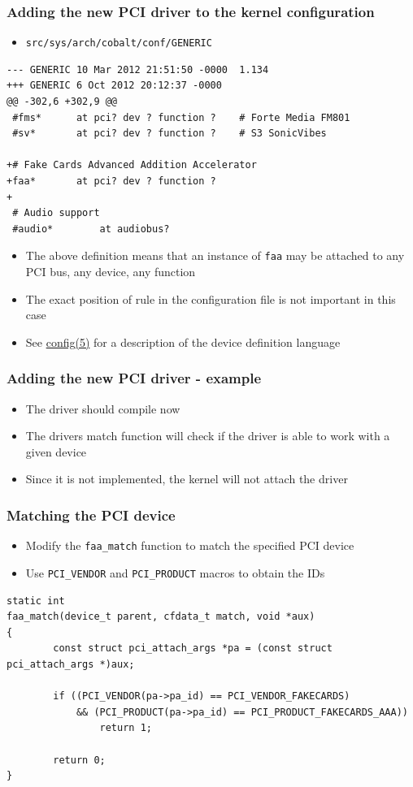 \documentclass[dvipsnames,table]{beamer}
\begin{document}
\begin{frame}[fragile]
\frametitle{Adding the new PCI driver to the kernel configuration}
\scriptsize
\begin{itemize}
	\item {\tt src/sys/arch/cobalt/conf/GENERIC}
\end{itemize}
\begin{verbatim}
--- GENERIC	10 Mar 2012 21:51:50 -0000	1.134
+++ GENERIC	6 Oct 2012 20:12:37 -0000
@@ -302,6 +302,9 @@
 #fms*		at pci? dev ? function ?	# Forte Media FM801
 #sv*		at pci? dev ? function ?	# S3 SonicVibes
 
+# Fake Cards Advanced Addition Accelerator
+faa*		at pci? dev ? function ?
+
 # Audio support
 #audio*		at audiobus?
\end{verbatim}
\normalsize
\begin{itemize}
	\item The above definition means that an instance of {\tt faa} may be attached to any PCI bus, any device, any function
	\item The exact position of rule in the configuration file is not important in this case
	\item See \href{http://netbsd.gw.com/cgi-bin/man-cgi?config+5+NetBSD-current}{config(5)} for a description of the device definition language
\end{itemize}
\end{frame}

\begin{frame}
\frametitle{Adding the new PCI driver - example}
\begin{itemize}
	\item The driver should compile now
	\item The drivers match function will check if the driver is able to work with a given device
 	\item Since it is not implemented, the kernel will not attach the driver
\end{itemize}
\end{frame}

\begin{frame}[fragile]
\frametitle{Matching the PCI device}
\begin{itemize}
	\item Modify the {\tt faa\_match} function to match the specified PCI device
	\item Use {\tt PCI\_VENDOR} and {\tt PCI\_PRODUCT} macros to obtain the IDs
\end{itemize}
\scriptsize
\begin{lstlisting}
static int
faa_match(device_t parent, cfdata_t match, void *aux)
{
        const struct pci_attach_args *pa = (const struct pci_attach_args *)aux;

        if ((PCI_VENDOR(pa->pa_id) == PCI_VENDOR_FAKECARDS) 
            && (PCI_PRODUCT(pa->pa_id) == PCI_PRODUCT_FAKECARDS_AAA))
                return 1;

        return 0;
}
\end{lstlisting}
\end{frame}
\end{document}
